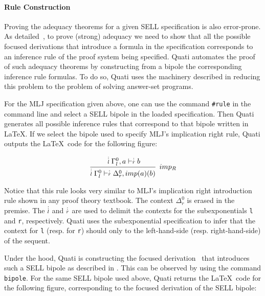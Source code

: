 \documentclass{llncs}
\newcommand{\ndots}[1]{\stackrel{\vcenter{\hbox{$\scriptstyle :$}\vskip-.35ex}}
   {\hbox {$ \scriptstyle {#1}$}}}
\begin{document}
\vspace{-2mm}

\paragraph{Rule Construction} Proving the adequacy theorems for a given SELL specification is also 
error-prone. As detailed~\cite{nigam.jlc}, to prove (strong) adequacy we need to show that all 
the possible focused derivations that introduce a formula in the specification corresponds to 
an inference rule of the proof system being specified. Quati automates the proof of such 
adequacy theorems by constructing from a bipole the corresponding inference rule formulas. 
To do so, Quati uses the machinery described in \cite{nigam13iclp,nigam14ebl} reducing
this problem to the problem of solving answer-set programs. 

For the MLJ specification given above, one can use the command \texttt{\#rule} in the command 
line and select a SELL bipole in the loaded specification. Then Quati generates all possible 
inference rules that correspond to that bipole written in \LaTeX. If we select the bipole used to specify 
MLJ's implication right rule, Quati outputs the \LaTeX\ code for the following figure:
\vspace{-3mm}

{\small
\[
\cfrac{ \ndots{l} \Gamma_{l}^{0}, a \vdash  \ndots{r} b}
{ \ndots{l} \Gamma_{l}^{0} \vdash  \ndots{r} \Delta_{r}^{0}, imp (a) (b) } \;\; imp_{R}
\]
}

Notice that this rule looks very similar to MLJ's implication right introduction rule shown in any proof theory 
textbook. The context $\Delta_{r}^{0}$ is erased in the premise. The $\ndots{l}$ and $\ndots{r}$ are used to 
delimit the contexts for the subexponentials \texttt{l} and \texttt{r}, respectively. Quati uses the subexponential 
specification to infer that the context for \texttt{l} (resp. for \texttt{r}) should only to the left-hand-side (resp. 
right-hand-side) of the sequent.

Under the hood, Quati is constructing the focused derivation~\cite{andreoli92jlc} that introduces such 
a SELL bipole as described in \cite{nigam.jlc}. This can be observed by using the command 
\texttt{bipole}. For the same SELL bipole used above, Quati returns
the \LaTeX\ code for the following figure, corresponding to the focused derivation of the SELL bipole:
\vspace{-4mm}
\end{document}
